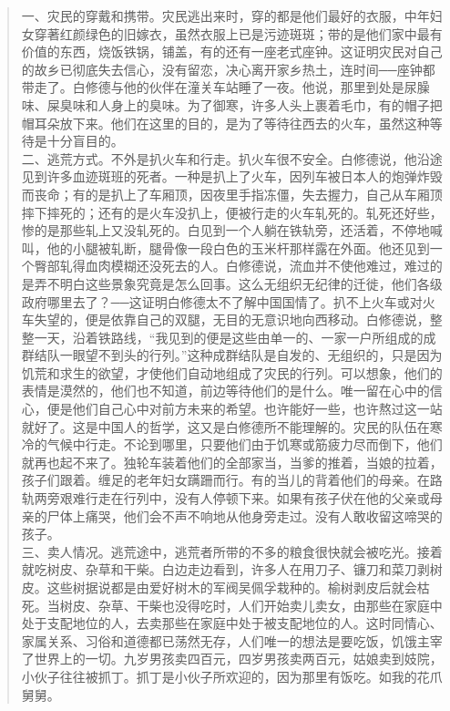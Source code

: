\begin{quote}
	一、灾民的穿戴和携带。灾民逃出来时，穿的都是他们最好的衣服，中年妇女穿著红颜绿色的旧嫁衣，虽然衣服上已是污迹斑斑；带的是他们家中最有价值的东西，烧饭铁锅，铺盖，有的还有一座老式座钟。这证明灾民对自己的故乡已彻底失去信心，没有留恋，决心离开家乡热土，连时间──座钟都带走了。白修德与他的伙伴在潼关车站睡了一夜。他说，那里到处是尿臊味、屎臭味和人身上的臭味。为了御寒，许多人头上裹着毛巾，有的帽子把帽耳朵放下来。他们在这里的目的，是为了等待往西去的火车，虽然这种等待是十分盲目的。\\

二、逃荒方式。不外是扒火车和行走。扒火车很不安全。白修德说，他沿途见到许多血迹斑班的死者。一种是扒上了火车，因列车被日本人的炮弹炸毁而丧命；有的是扒上了车厢顶，因夜里手指冻僵，失去握力，自己从车厢顶摔下摔死的；还有的是火车没扒上，便被行走的火车轧死的。轧死还好些，惨的是那些轧上又没轧死的。白见到一个人躺在铁轨旁，还活着，不停地喊叫，他的小腿被轧断，腿骨像一段白色的玉米杆那样露在外面。他还见到一个臀部轧得血肉模糊还没死去的人。白修德说，流血并不使他难过，难过的是弄不明白这些景象究竟是怎么回事。这么无组织无纪律的迁徙，他们各级政府哪里去了？──这证明白修德太不了解中国国情了。扒不上火车或对火车失望的，便是依靠自己的双腿，无目的无意识地向西移动。白修德说，整整一天，沿着铁路线，“我见到的便是这些由单一的、一家一户所组成的成群结队一眼望不到头的行列。”这种成群结队是自发的、无组织的，只是因为饥荒和求生的欲望，才使他们自动地组成了灾民的行列。可以想象，他们的表情是漠然的，他们也不知道，前边等待他们的是什么。唯一留在心中的信心，便是他们自己心中对前方未来的希望。也许能好一些，也许熬过这一站就好了。这是中国人的哲学，这又是白修德所不能理解的。灾民的队伍在寒冷的气候中行走。不论到哪里，只要他们由于饥寒或筋疲力尽而倒下，他们就再也起不来了。独轮车装着他们的全部家当，当爹的推着，当娘的拉着，孩子们跟着。缠足的老年妇女蹒跚而行。有的当儿的背着他们的母亲。在路轨两旁艰难行走在行列中，没有人停顿下来。如果有孩子伏在他的父亲或母亲的尸体上痛哭，他们会不声不响地从他身旁走过。没有人敢收留这啼哭的孩子。\\

三、卖人情况。逃荒途中，逃荒者所带的不多的粮食很快就会被吃光。接着就吃树皮、杂草和干柴。白边走边看到，许多人在用刀子、镰刀和菜刀剥树皮。这些树据说都是由爱好树木的军阀吴佩孚栽种的。榆树剥皮后就会枯死。当树皮、杂草、干柴也没得吃时，人们开始卖儿卖女，由那些在家庭中处于支配地位的人，去卖那些在家庭中处于被支配地位的人。这时同情心、家属关系、习俗和道德都已荡然无存，人们唯一的想法是要吃饭，饥饿主宰了世界上的一切。九岁男孩卖四百元，四岁男孩卖两百元，姑娘卖到妓院，小伙子往往被抓丁。抓丁是小伙子所欢迎的，因为那里有饭吃。如我的花爪舅舅。\\


\end{quote}

